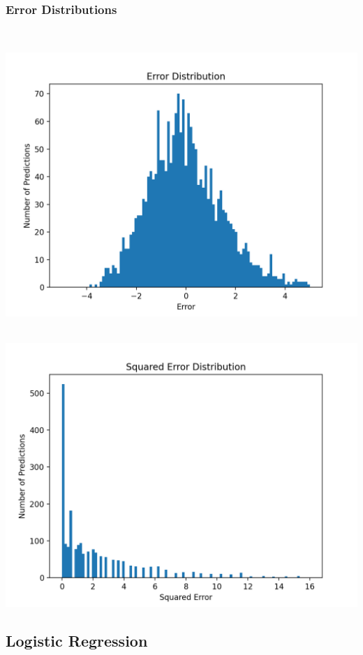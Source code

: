 \documentclass[11pt]{article}
\begin{document}
\subsubsection{Error Distributions}
\mbox{}\\
\begin{minipage}{0.45\textwidth}
\includegraphics[scale=0.5]{random_forest/error.png}
\end{minipage}
\hfill
\begin{minipage}{0.45\textwidth}
\mbox{}\\
\includegraphics[scale=0.5]{random_forest/squared_error.png}
\end{minipage}


\subsection{Logistic Regression}
\end{document}
